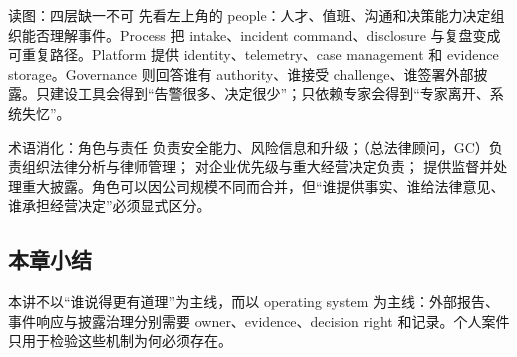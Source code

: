 
\begin{knowledgebox}{读图：四层缺一不可}
先看左上角的 people：人才、值班、沟通和决策能力决定组织能否理解事件。Process 把 intake、incident command、disclosure 与复盘变成可重复路径。Platform 提供 identity、telemetry、case management 和 evidence storage。Governance 则回答谁有 authority、谁接受 challenge、谁签署外部披露。只建设工具会得到“告警很多、决定很少”；只依赖专家会得到“专家离开、系统失忆”。
\end{knowledgebox}


\begin{knowledgebox}{术语消化：角色与责任}
 负责安全能力、风险信息和升级；（总法律顾问，GC）负责组织法律分析与律师管理； 对企业优先级与重大经营决定负责； 提供监督并处理重大披露。角色可以因公司规模不同而合并，但“谁提供事实、谁给法律意见、谁承担经营决定”必须显式区分。
\end{knowledgebox}

\subsection{本章小结}

本讲不以“谁说得更有道理”为主线，而以 operating system 为主线：外部报告、事件响应与披露治理分别需要 owner、evidence、decision right 和记录。个人案件只用于检验这些机制为何必须存在。

